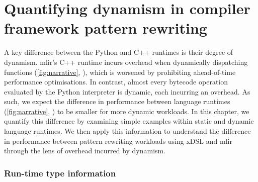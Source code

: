 \chapter{Quantifying dynamism in compiler framework pattern rewriting}
\label{chap:dynamism-pattern-rewriting}

A key difference between the Python and C++ runtimes is their degree of dynamism.
\ac{mlir}'s C++ runtime incurs overhead when dynamically dispatching functions (\autoref{fig:narrative}, ), which is worsened by prohibiting ahead-of-time performance optimisations. In contrast, almost every bytecode operation evaluated by the Python interpreter is dynamic, each incurring an overhead.
As such, we expect the difference in performance between language runtimes (\autoref{fig:narrative}, ) to be smaller for more dynamic workloads.
In this chapter, we quantify this difference by examining simple examples within static and dynamic language runtimes. We then apply this information to understand the difference in performance between pattern rewriting workloads using xDSL and \ac{mlir} through the lens of overhead incurred by dynamism.





\subsection{Run-time type information}

